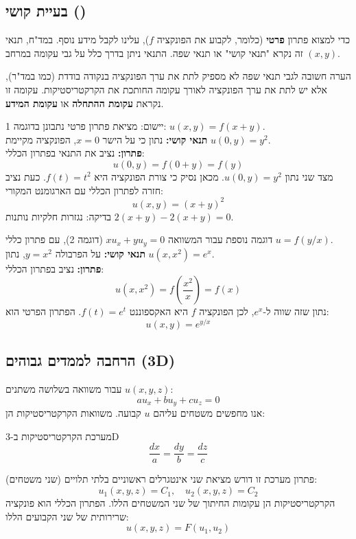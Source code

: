 \subsection{בעיית קושי ()}

כדי למצוא פתרון \textbf{פרטי} (כלומר, לקבוע את הפונקציה $f$), עלינו לקבל מידע נוסף. במד"ח, תנאי זה נקרא "תנאי קושי" או תנאי שפה. התנאי ניתן בדרך כלל על גבי עקומה במרחב $(x,y)$.

\begin{notebox}{הערה חשובה לגבי תנאי שפה}
לא מספיק לתת את ערך הפונקציה בנקודה בודדת (כמו במד"ר), אלא יש לתת את ערך הפונקציה לאורך עקומה החותכת את הקרקטריסטיקות. עקומה זו נקראת \textbf{עקומת ההתחלה} או \textbf{עקומת המידע}.
\end{notebox}

\begin{physicsapplication}{יישום: מציאת פתרון פרטי}
נתבונן בדוגמה 1: $u(x,y) = f(x+y)$.
\\
\textbf{תנאי קושי:} נתון כי על הישר $x=0$, הפונקציה מקיימת $u(0,y) = y^2$.
\\
\textbf{פתרון:}
נציב את התנאי בפתרון הכללי:
\[ u(0,y) = f(0+y) = f(y) \]
מצד שני נתון $u(0,y) = y^2$. מכאן נסיק כי צורת הפונקציה היא $f(t) = t^2$.
כעת נציב חזרה לפתרון הכללי עם הארגומנט המקורי:
\[ u(x,y) = (x+y)^2 \]
בדיקה: נגזרות חלקיות נותנות $2(x+y) - 2(x+y) = 0$.
\end{physicsapplication}

\begin{physicsapplication}{דוגמה נוספת}
עבור המשוואה $x u_x + y u_y = 0$ (דוגמה 2), עם פתרון כללי $u = f(y/x)$.
\\
\textbf{תנאי קושי:} על הפרבולה $y=x^2$, נתון $u(x,x^2) = e^x$.
\\
\textbf{פתרון:}
נציב בפתרון הכללי:
\[ u(x,x^2) = f\left(\frac{x^2}{x}\right) = f(x) \]
נתון שזה שווה ל-$e^x$, לכן הפונקציה $f$ היא האקספוננט $f(t) = e^t$.
הפתרון הפרטי הוא:
\[ u(x,y) = e^{y/x} \]
\end{physicsapplication}

\subsection{הרחבה לממדים גבוהים (3D)}

עבור משוואה בשלושה משתנים $u(x,y,z)$:
\[ a u_x + b u_y + c u_z = 0 \]
אנו מחפשים משטחים עליהם $u$ קבועה. משוואות הקרקטריסטיקות הן:
\begin{formulabox}{מערכת הקרקטריסטיקות ב-3D}
\[ \frac{dx}{a} = \frac{dy}{b} = \frac{dz}{c} \]
\end{formulabox}
פתרון מערכת זו דורש מציאת שני אינטגרלים ראשוניים בלתי תלויים (שני משטחים):
\[ u_1(x,y,z) = C_1, \quad u_2(x,y,z) = C_2 \]
הקרקטריסטיקות הן עקומות החיתוך של שני המשטחים הללו. הפתרון הכללי הוא פונקציה שרירותית של שני הקבועים הללו:
\[ u(x,y,z) = F(u_1, u_2) \]

